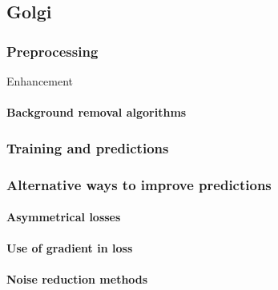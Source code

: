 \subsection{Golgi}
    \subsubsection{Preprocessing}
        Enhancement
        
        \paragraph{Background removal algorithms}
            \label{par:background-removal}
            
    \subsubsection{Training and predictions}
        

    \subsubsection{Alternative ways to improve predictions}
        \paragraph{Asymmetrical losses}
            
        \paragraph{Use of gradient in loss}
        \paragraph{Noise reduction methods}
